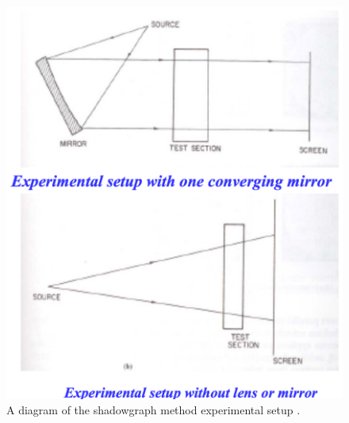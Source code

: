 \begin{figure}[htpb]
    \centering
    \includegraphics[width=0.8\linewidth]{Figures/shadowgraph.png}
    \caption[Diagram of the shadowgraph method.]{A diagram of the shadowgraph method experimental setup \citep{lecture9}.}
    \label{fig:shadowgraph_setup}
\end{figure}